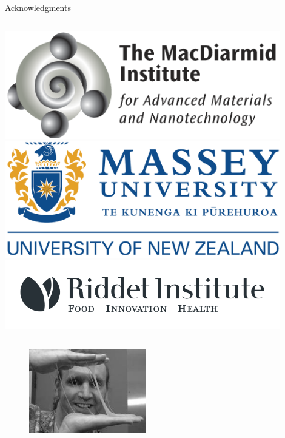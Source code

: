 \documentclass[10pt]{beamer}
\begin{document}
\begin{frame}{Acknowledgments}

  \vspace{0.3cm}
  \begin{columns}[onlytextwidth]
    \includegraphics[width=0.9\textwidth]{./Figures/people/macdiarmid.png}
    \includegraphics[width=0.9\textwidth]{./Figures/people/massey.png}
    \includegraphics[width=0.9\textwidth]{./Figures/people/riddet.png}
  \end{columns}
  \begin{columns}[onlytextwidth]
\begin{figure}[htpb]
  \centering
  \includegraphics[width=0.8\textwidth]{./Figures/people/bill.png}

\end{figure}
\end{columns}
\end{frame}
\end{document}
